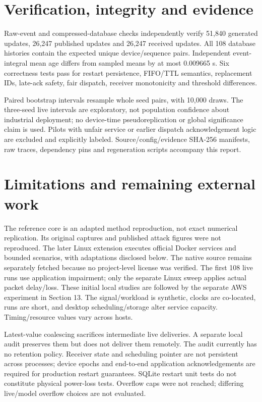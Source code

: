 \documentclass[11pt,a4paper]{article}
\begin{document}
\section{Verification, integrity and evidence}

Raw-event and compressed-database checks independently verify 51,840 generated updates, 26,247 published updates and 26,247 received updates. All 108 database histories contain the expected unique device/sequence pairs. Independent event-integral mean age differs from sampled means by at most 0.009665 s. Six correctness tests pass for restart persistence, FIFO/TTL semantics, replacement IDs, late-ack safety, fair dispatch, receiver monotonicity and threshold differences.


Paired bootstrap intervals resample whole seed pairs, with 10,000 draws. The three-seed live intervals are exploratory, not population confidence about industrial deployment; no device-time pseudoreplication or global significance claim is used. Pilots with unfair service or earlier dispatch acknowledgement logic are excluded and explicitly labeled. Source/config/evidence SHA-256 manifests, raw traces, dependency pins and regeneration scripts accompany this report.


\section{Limitations and remaining external work}

The reference core is an adapted method reproduction, not exact numerical replication. Its original captures and published attack figures were not reproduced. The later Linux extension executes official Docker services and bounded scenarios, with adaptations disclosed below. The native source remains separately fetched because no project-level license was verified. The first 108 live runs use application impairment; only the separate Linux sweep applies actual packet delay/loss. These initial local studies are followed by the separate AWS experiment in Section 13. The signal/workload is synthetic, clocks are co-located, runs are short, and desktop scheduling/storage alter service capacity. Timing/resource values vary across hosts.


Latest-value coalescing sacrifices intermediate live deliveries. A separate local audit preserves them but does not deliver them remotely. The audit currently has no retention policy. Receiver state and scheduling pointer are not persistent across processes; device epochs and end-to-end application acknowledgements are required for production restart guarantees. SQLite restart unit tests do not constitute physical power-loss tests. Overflow caps were not reached; differing live/model overflow choices are not evaluated.
\end{document}
